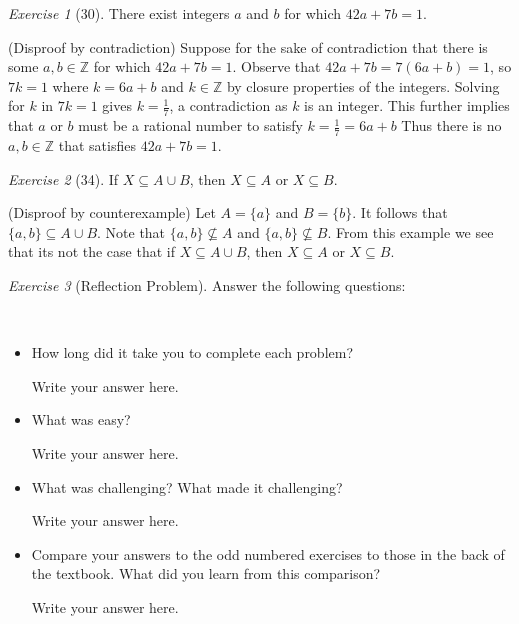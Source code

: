 \documentclass[12pt]{amsart}
\makeatletter
\theoremstyle{remark}
\newtheorem*{exercise}{Exercise}%
\def\ZZ{\ensuremath{\mathbb Z}}
\renewenvironment{proof}[1][\proofname]{\par\doublespacing
  \pushQED{\qed}%
  \normalfont \topsep6\p@\@plus6\p@\relax
  \list{}{%
    \settowidth{\leftmargin}{\itshape\proofname:\hskip\labelsep}%
    \setlength{\labelwidth}{0pt}%
    \setlength{\itemindent}{-\leftmargin}%
  }%
  \item[\hskip\labelsep\itshape#1\@addpunct{:}]\ignorespaces
}{%
  \popQED\endlist\@endpefalse
  \singlespacing
}
\theoremstyle{mycomment}
\makeatother
\begin{document}
\begin{exercise}[30] There exist integers $a$ and $b$ for which $42a+7b=1$.
\begin{proof}%
  (Disproof by contradiction) Suppose for the sake of contradiction that there is some $a,b \in \ZZ$ for which $42a+7b=1$. Observe that $42a + 7b = 7(6a + b) = 1$, so $7k =1$ where $k = 6a + b$ and $k \in \ZZ$ by closure properties of the integers. Solving for $k$ in $7k = 1$ gives $k = \frac{1}{7}$, a contradiction as $k$ is an integer. This further implies that $a$ or $b$ must be a rational number to satisfy $k = \frac{1}{7} = 6a + b$ Thus there is no $a,b \in \ZZ $ that satisfies $42a + 7b = 1$.
\end{proof}
\end{exercise}

\begin{exercise}[34] If $X\subseteq A\cup B$, then $X\subseteq A$ or $X\subseteq B$.
\begin{proof}%
  (Disproof by counterexample) Let $A = \{a\}$ and $B = \{b\}$. It follows that $\{a,b\} \subseteq A \cup B$. Note that $\{a,b\} \nsubseteq A$ and $\{a,b\} \nsubseteq B$. From this example we see that its not the case that if $X\subseteq A\cup B$, then $X\subseteq A$ or $X\subseteq B$.
\end{proof}
\end{exercise}



\begin{exercise}[Reflection Problem]
Answer the following questions:


\begin{proof} \ 


\begin{itemize}
\item How long did it take you to complete each problem? 

Write your answer here.
\item What was easy?

Write your answer here.
\item What was challenging? What made it challenging?

Write your answer here.
\item Compare your answers to the odd numbered exercises to those in the back of the textbook. What did you learn from this comparison?

Write your answer here.
\end{itemize}\end{proof}
\end{exercise}









 
\end{document}
